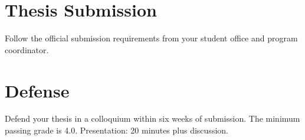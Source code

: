 \documentclass{../sharedAssets/tufte}
\begin{document}
\section{Thesis Submission}
Follow the official submission requirements from your student office and program coordinator.


\section{Defense}
Defend your thesis in a colloquium within six weeks of submission. The minimum passing grade is 4.0. Presentation: 20 minutes plus discussion.
\fi





\end{document}
